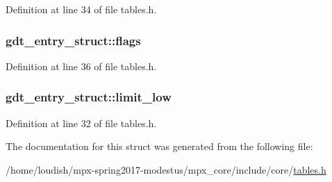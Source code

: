 Definition at line 34 of file tables.\+h.

\subsubsection[{\texorpdfstring{flags}{flags}}]{ gdt\+\_\+entry\+\_\+struct\+::flags}\hypertarget{structgdt__entry__struct_afac75bdf53080168c8899c442862410a}{}\label{structgdt__entry__struct_afac75bdf53080168c8899c442862410a}


Definition at line 36 of file tables.\+h.

\subsubsection[{\texorpdfstring{limit\+\_\+low}{limit_low}}]{ gdt\+\_\+entry\+\_\+struct\+::limit\+\_\+low}\hypertarget{structgdt__entry__struct_ada721fbdc3e8d3feae3b07d4b82a37bd}{}\label{structgdt__entry__struct_ada721fbdc3e8d3feae3b07d4b82a37bd}


Definition at line 32 of file tables.\+h.



The documentation for this struct was generated from the following file\+:\begin{DoxyCompactItemize}
\item 
/home/loudish/mpx-\/spring2017-\/modestus/mpx\+\_\+core/include/core/\hyperlink{tables_8h}{tables.\+h}\end{DoxyCompactItemize}
